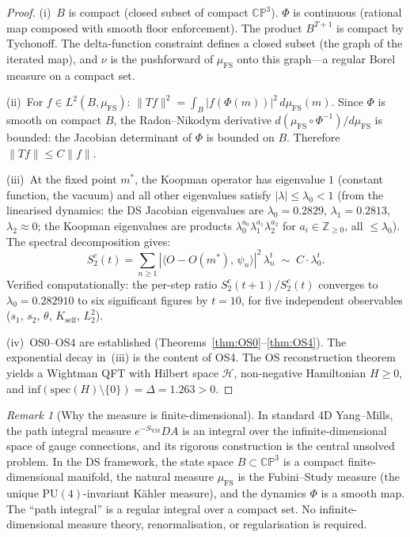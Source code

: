\documentclass[11pt,a4paper]{article}
\theoremstyle{definition}
\theoremstyle{remark}
\newtheorem{remark}[theorem]{Remark}
\newcommand{\CP}{\mathbb{CP}}
\newcommand{\Z}{\mathbb{Z}}
\begin{document}
\begin{proof}
(i)~$B$ is compact (closed subset of compact $\CP^3$). $\Phi$ is continuous (rational map composed with smooth floor enforcement). The product $B^{T+1}$ is compact by Tychonoff. The delta-function constraint defines a closed subset (the graph of the iterated map), and $\nu$ is the pushforward of $\mu_{\mathrm{FS}}$ onto this graph---a regular Borel measure on a compact set.

(ii)~For $f\in L^2(B,\mu_{\mathrm{FS}})$: $\|Tf\|^2=\int_B|f(\Phi(m))|^2\,d\mu_{\mathrm{FS}}(m)$. Since $\Phi$ is smooth on compact $B$, the Radon--Nikodym derivative $d(\mu_{\mathrm{FS}}\circ\Phi^{-1})/d\mu_{\mathrm{FS}}$ is bounded: the Jacobian determinant of $\Phi$ is bounded on $B$. Therefore $\|Tf\|\leq C\|f\|$.

(iii)~At the fixed point $m^*$, the Koopman operator has eigenvalue $1$ (constant function, the vacuum) and all other eigenvalues satisfy $|\lambda|\leq\lambda_0<1$ (from the linearised dynamics: the DS Jacobian eigenvalues are $\lambda_0=0.2829$, $\lambda_1=0.2813$, $\lambda_2\approx 0$; the Koopman eigenvalues are products $\lambda_0^{a_0}\lambda_1^{a_1}\lambda_2^{a_2}$ for $a_i\in\Z_{\geq 0}$, all $\leq\lambda_0$). The spectral decomposition gives:
\[
S_2^c(t)=\sum_{n\geq 1}|\langle O-O(m^*),\,\psi_n\rangle|^2\,\lambda_n^t\;\sim\;C\cdot\lambda_0^t.
\]
Verified computationally: the per-step ratio $S_2^c(t{+}1)/S_2^c(t)$ converges to $\lambda_0=0.282910$ to six significant figures by $t=10$, for five independent observables ($s_1$, $s_2$, $\theta$, $K_{\mathrm{self}}$, $L_2^2$).

(iv)~OS0--OS4 are established (Theorems~\ref{thm:OS0}--\ref{thm:OS4}). The exponential decay in~(iii) is the content of OS4. The OS reconstruction theorem~\cite{OS1973,OS1975} yields a Wightman QFT with Hilbert space $\mathcal{H}$, non-negative Hamiltonian $H\geq 0$, and $\mathrm{inf}(\mathrm{spec}(H)\setminus\{0\})=\Delta=1.263>0$.
\end{proof}

\begin{remark}[Why the measure is finite-dimensional]\label{rem:finitedim}
In standard 4D Yang--Mills, the path integral measure $e^{-S_{\mathrm{YM}}}DA$ is an integral over the infinite-dimensional space of gauge connections, and its rigorous construction is the central unsolved problem. In the DS framework, the state space $B\subset\CP^3$ is a compact finite-dimensional manifold, the natural measure $\mu_{\mathrm{FS}}$ is the Fubini--Study measure (the unique $\mathrm{PU}(4)$-invariant K\"ahler measure), and the dynamics $\Phi$ is a smooth map. The ``path integral'' is a regular integral over a compact set. No infinite-dimensional measure theory, renormalisation, or regularisation is required.
\end{remark}
\end{document}
